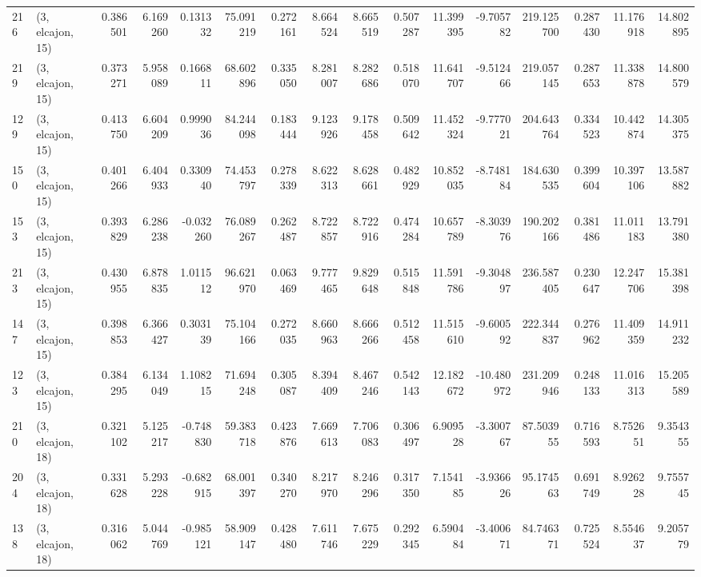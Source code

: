 \begin{tabular}{llrrrrrrrrrrrrrr}
216 &  (3, elcajon, 15) &   0.386501 &   6.169260 &  0.131332 &   75.091219 &  0.272161 &   8.664524 &   8.665519 &  0.507287 &  11.399395 &  -9.705782 &  219.125700 &  0.287430 &  11.176918 &  14.802895 \\
219 &  (3, elcajon, 15) &   0.373271 &   5.958089 &  0.166811 &   68.602896 &  0.335050 &   8.281007 &   8.282686 &  0.518070 &  11.641707 &  -9.512466 &  219.057145 &  0.287653 &  11.338878 &  14.800579 \\
129 &  (3, elcajon, 15) &   0.413750 &   6.604209 &  0.999036 &   84.244098 &  0.183444 &   9.123926 &   9.178458 &  0.509642 &  11.452324 &  -9.777021 &  204.643764 &  0.334523 &  10.442874 &  14.305375 \\
150 &  (3, elcajon, 15) &   0.401266 &   6.404933 &  0.330940 &   74.453797 &  0.278339 &   8.622313 &   8.628661 &  0.482929 &  10.852035 &  -8.748184 &  184.630535 &  0.399604 &  10.397106 &  13.587882 \\
153 &  (3, elcajon, 15) &   0.393829 &   6.286238 & -0.032260 &   76.089267 &  0.262487 &   8.722857 &   8.722916 &  0.474284 &  10.657789 &  -8.303976 &  190.202166 &  0.381486 &  11.011183 &  13.791380 \\
213 &  (3, elcajon, 15) &   0.430955 &   6.878835 &  1.011512 &   96.621970 &  0.063469 &   9.777465 &   9.829648 &  0.515848 &  11.591786 &  -9.304897 &  236.587405 &  0.230647 &  12.247706 &  15.381398 \\
147 &  (3, elcajon, 15) &   0.398853 &   6.366427 &  0.303139 &   75.104166 &  0.272035 &   8.660963 &   8.666266 &  0.512458 &  11.515610 &  -9.600592 &  222.344837 &  0.276962 &  11.409359 &  14.911232 \\
123 &  (3, elcajon, 15) &   0.384295 &   6.134049 &  1.108215 &   71.694248 &  0.305087 &   8.394409 &   8.467246 &  0.542143 &  12.182672 & -10.480972 &  231.209946 &  0.248133 &  11.016313 &  15.205589 \\
210 &  (3, elcajon, 18) &   0.321102 &   5.125217 & -0.748830 &   59.383718 &  0.423876 &   7.669613 &   7.706083 &  0.306497 &   6.909528 &  -3.300767 &   87.503955 &  0.716593 &   8.752651 &   9.354355 \\
204 &  (3, elcajon, 18) &   0.331628 &   5.293228 & -0.682915 &   68.001397 &  0.340270 &   8.217970 &   8.246296 &  0.317350 &   7.154185 &  -3.936626 &   95.174563 &  0.691749 &   8.926228 &   9.755745 \\
138 &  (3, elcajon, 18) &   0.316062 &   5.044769 & -0.985121 &   58.909147 &  0.428480 &   7.611746 &   7.675229 &  0.292345 &   6.590484 &  -3.400671 &   84.746371 &  0.725524 &   8.554637 &   9.205779 \\

\end{tabular}
